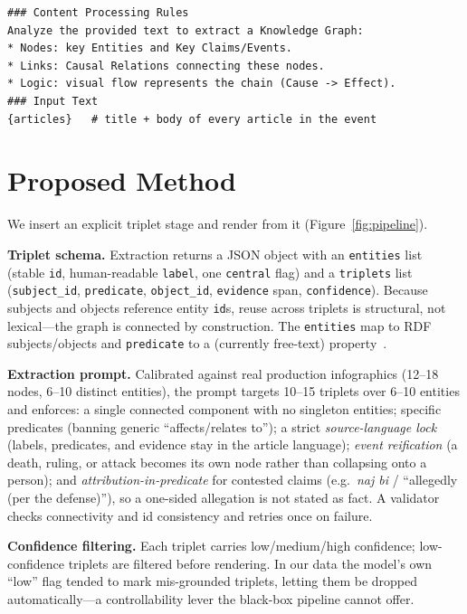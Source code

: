 \documentclass[sigconf,natbib=false, language=english]{acmart}
\begin{document}
\begin{lstlisting}[caption={Excerpt of the production prompt: a single call both extracts and renders the graph from the concatenated articles.}, label={lst:prod}]
### Content Processing Rules
Analyze the provided text to extract a Knowledge Graph:
* Nodes: key Entities and Key Claims/Events.
* Links: Causal Relations connecting these nodes.
* Logic: visual flow represents the chain (Cause -> Effect).
### Input Text
{articles}   # title + body of every article in the event
\end{lstlisting}

\section{Proposed Method}
We insert an explicit triplet stage and render from it (Figure~\ref{fig:pipeline}).

\textbf{Triplet schema.} Extraction returns a JSON object with an \texttt{entities} list (stable \texttt{id}, human-readable \texttt{label}, one \texttt{central} flag) and a \texttt{triplets} list (\texttt{subject\_id}, \texttt{predicate}, \texttt{object\_id}, \texttt{evidence} span, \texttt{confidence}). Because subjects and objects reference entity \texttt{id}s, reuse across triplets is structural, not lexical---the graph is connected by construction. The \texttt{entities} map to RDF subjects/objects and \texttt{predicate} to a (currently free-text) property~\cite{rdf11}.

\textbf{Extraction prompt.} Calibrated against real production infographics (12--18 nodes, 6--10 distinct entities), the prompt targets 10--15 triplets over 6--10 entities and enforces: a single connected component with no singleton entities; specific predicates (banning generic ``affects/relates to''); a strict \emph{source-language lock} (labels, predicates, and evidence stay in the article language); \emph{event reification} (a death, ruling, or attack becomes its own node rather than collapsing onto a person); and \emph{attribution-in-predicate} for contested claims (e.g.\ \emph{naj bi} / ``allegedly (per the defense)''), so a one-sided allegation is not stated as fact. A validator checks connectivity and id consistency and retries once on failure.

\textbf{Confidence filtering.} Each triplet carries low/medium/high confidence; low-confidence triplets are filtered before rendering. In our data the model's own ``low'' flag tended to mark mis-grounded triplets, letting them be dropped automatically---a controllability lever the black-box pipeline cannot offer.
\end{document}
